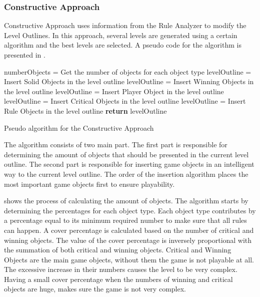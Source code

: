 \subsubsection{Constructive Approach}
Constructive Approach uses information from the Rule Analyzer to modify the Level Outlines. In this approach, several levels are generated using a certain algorithm and the best levels are selected. A pseudo code for the algorithm is presented in .\\

\begin{algorithm}[H]  
	\BlankLine
	numberObjects = Get the number of objects for each object type\;
	\BlankLine
	levelOutline = Insert Solid Objects in the level outline\;
	levelOutline = Insert Winning Objects in the level outline\;
	levelOutline = Insert Player Object in the level outline\;
	levelOutline = Insert Critical Objects in the level outline\;
	levelOutline = Insert Rule Objects in the level outline\;
	\BlankLine
	\textbf{return} levelOutline\;
	\caption{Pseudo algorithm for the Constructive Approach}
	\label{Algorithm:constructiveApproach}
\end{algorithm}
The algorithm consists of two main part. The first part is responsible for determining the amount of objects that should be presented in the current level outline. The second part is responsible for inserting game objects in an intelligent way to the current level outline. The order of the insertion algorithm places the most important game objects first to ensure playability.\\\par

 shows the process of calculating the amount of objects. The algorithm starts by determining the percentages for each object type. Each object type contributes by a percentage equal to its minimum required number to make sure that all rules can happen. A cover percentage is calculated based on the number of critical and winning objects. The value of the cover percentage is inversely proportional with the summation of both critical and winning objects. Critical and Winning Objects are the main game objects, without them the game is not playable at all. The excessive increase in their numbers causes the level to be very complex. Having a small cover percentage when the numbers of winning and critical objects are huge, makes sure the game is not very complex.\\

